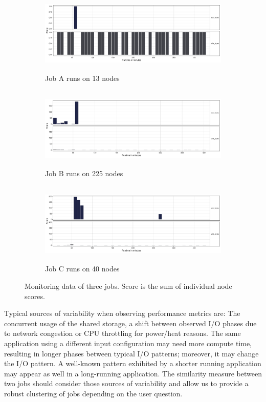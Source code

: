 \documentclass[]{llncs}
\begin{document}
\begin{figure}
        \centering
         \begin{subfigure}[t]{\textwidth}
           \includegraphics[width=4.61in,height=1.54in]{./media/image27.png}
           \caption{Job A runs on 13 nodes}
           \label{fig:typ_io:1}
         \end{subfigure}

        \begin{subfigure}[t]{\textwidth}
           \includegraphics[width=4.61in,height=1.54in]{./media/image28.png}
           \caption{Job B runs on 225 nodes}
           \label{fig:typ_io:2}
         \end{subfigure}

        \begin{subfigure}[t]{\textwidth}
          \includegraphics[width=4.61in,height=1.54in]{./media/image25.png}
          \caption{Job C runs on 40 nodes}
          \label{fig:typ_io:3}
        \end{subfigure}
\caption{Monitoring data of three jobs. Score is the sum of individual node scores.}
         \label{fig:typ_io:all}
\end{figure}

Typical sources of variability when observing performance metrics are: The concurrent usage of the shared storage, a shift between observed I/O phases due to network congestion or CPU throttling for power/heat reasons.
The same application using a different input configuration may need more compute time, resulting in longer phases between typical I/O patterns; moreover, it may change the I/O pattern.
A well-known pattern exhibited by a shorter running application may appear as well in a long-running application.
The similarity measure between two jobs should consider those sources of variability and allow us to provide a robust clustering of jobs depending on the user question.
\end{document}
